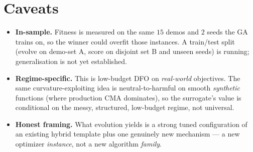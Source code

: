\documentclass[11pt]{article}
\begin{document}
\section{Caveats}

\begin{itemize}
\item \textbf{In-sample.} Fitness is measured on the same $15$ demos and $2$ seeds the
GA trains on, so the winner could overfit those instances. A train/test split (evolve
on demo-set A, score on disjoint set B and unseen seeds) is running; generalisation is
not yet established.
\item \textbf{Regime-specific.} This is low-budget DFO on \emph{real-world} objectives.
The same curvature-exploiting idea is neutral-to-harmful on
smooth \emph{synthetic} functions (where production CMA dominates), so the surrogate's
value is conditional on the messy, structured, low-budget regime, not universal.
\item \textbf{Honest framing.} What evolution yields is a strong tuned configuration of
an existing hybrid template plus one genuinely new mechanism --- a new optimizer
\emph{instance}, not a new algorithm \emph{family}.
\end{itemize}
\end{document}
